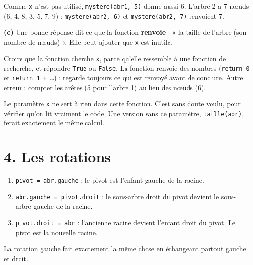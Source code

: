 \documentclass[11pt, a4paper]{exam}
\newcommand{\code}[1]{\texttt{#1}}
\begin{document}
Comme \code{x} n'est pas utilisé, \code{mystere(abr1, 5)} donne aussi 6. L'arbre 2 a 7 nœuds (6, 4, 8, 3, 5, 7, 9) : \code{mystere(abr2, 6)} et \code{mystere(abr2, 7)} renvoient 7.

\textbf{(c)} Une bonne réponse dit ce que la fonction \textbf{renvoie} : « la taille de l'arbre (son nombre de nœuds) ». Elle peut ajouter que \code{x} est inutile.
\begin{erreur}
Croire que la fonction cherche \code{x}, parce qu'elle ressemble à une fonction de recherche, et répondre \code{True} ou \code{False}. La fonction renvoie des nombres (\code{return 0} et \code{return 1 + \ldots}) : regarde toujours ce qui est renvoyé avant de conclure. Autre erreur : compter les arêtes (5 pour l'arbre 1) au lieu des nœuds (6).
\end{erreur}
\begin{remarque}
Le paramètre \code{x} ne sert à rien dans cette fonction. C'est sans doute voulu, pour vérifier qu'on lit vraiment le code. Une version sans ce paramètre, \code{taille(abr)}, ferait exactement le même calcul.
\end{remarque}


\section*{4. Les rotations}

\begin{retenir}
\begin{enumerate}
\item \code{pivot = abr.gauche} : le pivot est l'enfant gauche de la racine.
\item \code{abr.gauche = pivot.droit} : le sous-arbre droit du pivot devient le sous-arbre gauche de la racine.
\item \code{pivot.droit = abr} : l'ancienne racine devient l'enfant droit du pivot. Le pivot est la nouvelle racine.
\end{enumerate}
La rotation gauche fait exactement la même chose en échangeant partout gauche et droit.
\end{retenir}
\end{document}
